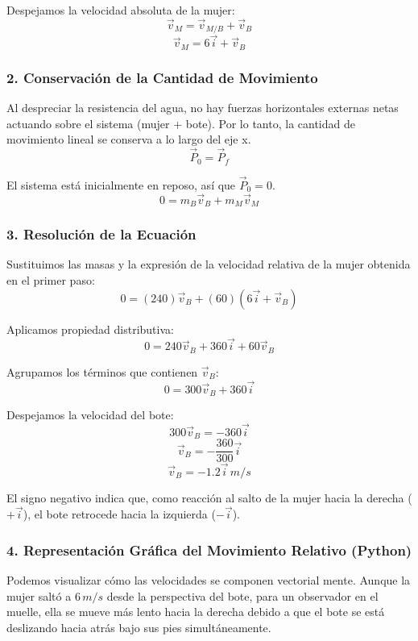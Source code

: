 \documentclass[12pt, a4paper]{article}
\begin{document}
Despejamos la velocidad absoluta de la mujer:
\[ \vec{v}_M = \vec{v}_{M/B} + \vec{v}_B \]
\[ \vec{v}_M = 6\vec{i} + \vec{v}_B \]

\subsubsection*{2. Conservación de la Cantidad de Movimiento}
Al despreciar la resistencia del agua, no hay fuerzas horizontales externas netas actuando sobre el sistema (mujer + bote). Por lo tanto, la cantidad de movimiento lineal se conserva a lo largo del eje x.
\[ \vec{P}_0 = \vec{P}_f \]

El sistema está inicialmente en reposo, así que $\vec{P}_0 = 0$.
\[ 0 = m_B \vec{v}_B + m_M \vec{v}_M \]

\subsubsection*{3. Resolución de la Ecuación}
Sustituimos las masas y la expresión de la velocidad relativa de la mujer obtenida en el primer paso:
\[ 0 = (240) \vec{v}_B + (60) (6\vec{i} + \vec{v}_B) \]

Aplicamos propiedad distributiva:
\[ 0 = 240 \vec{v}_B + 360\vec{i} + 60 \vec{v}_B \]

Agrupamos los términos que contienen $\vec{v}_B$:
\[ 0 = 300 \vec{v}_B + 360\vec{i} \]

Despejamos la velocidad del bote:
\[ 300 \vec{v}_B = -360\vec{i} \]
\[ \vec{v}_B = -\frac{360}{300} \vec{i} \]
\[ \vec{v}_B = -1.2 \vec{i} \, \si{m/s} \]

El signo negativo indica que, como reacción al salto de la mujer hacia la derecha ($+\vec{i}$), el bote retrocede hacia la izquierda ($-\vec{i}$).

\subsubsection*{4. Representación Gráfica del Movimiento Relativo (Python)}
Podemos visualizar cómo las velocidades se componen vectorial mente. Aunque la mujer saltó a $6 \, \si{m/s}$ desde la perspectiva del bote, para un observador en el muelle, ella se mueve más lento hacia la derecha debido a que el bote se está deslizando hacia atrás bajo sus pies simultáneamente.
\end{document}
